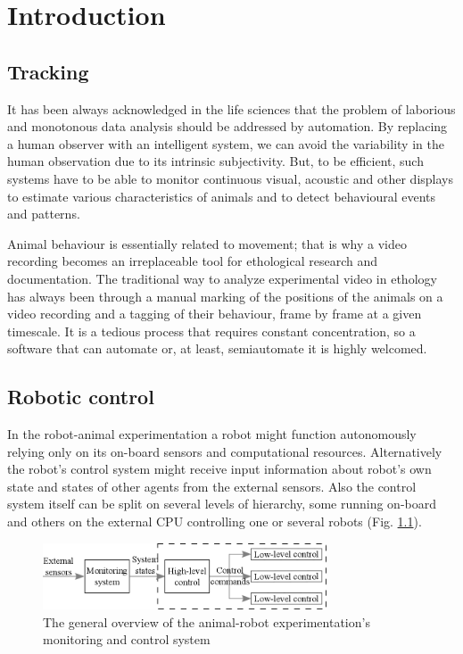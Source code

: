 \documentclass{styles/assisi}
\begin{document}


\chapter{Introduction}\label{chap:intro}
\section{Tracking}
It has been always acknowledged in the life sciences that the problem of laborious and monotonous data analysis should be addressed by automation. By replacing a human observer with an intelligent system, we can avoid the variability in the human observation due to its intrinsic subjectivity. But, to be efficient, such systems have to be able to monitor continuous visual, acoustic and other displays to estimate various characteristics of animals and to detect behavioural events and patterns.

Animal behaviour is essentially related to movement; that is why a video recording becomes an irreplaceable tool for ethological research and documentation. The traditional way to analyze experimental video in ethology has always been through a manual marking of the positions of the animals on a video recording and a tagging of their behaviour, frame by frame at a given timescale. It is a tedious process that requires constant concentration, so a software that can automate or, at least, semiautomate it is highly welcomed.

\section{Robotic control}
In the robot-animal experimentation a robot might function autonomously relying only on its on-board sensors and computational resources. Alternatively the robot's control system might receive input information about robot's own state and states of other agents from the external sensors. Also the control system itself can be split on several levels of hierarchy, some running on-board and others on the external CPU controlling one or several robots (Fig. \ref{fig:overview}).

\begin{figure}[ht]
\centering
\includegraphics[width=0.75\textwidth]{./figs/overview.png}
\caption{The general overview of the animal-robot experimentation's monitoring and control system}
\label{fig:overview}
\end{figure}
\end{document}
